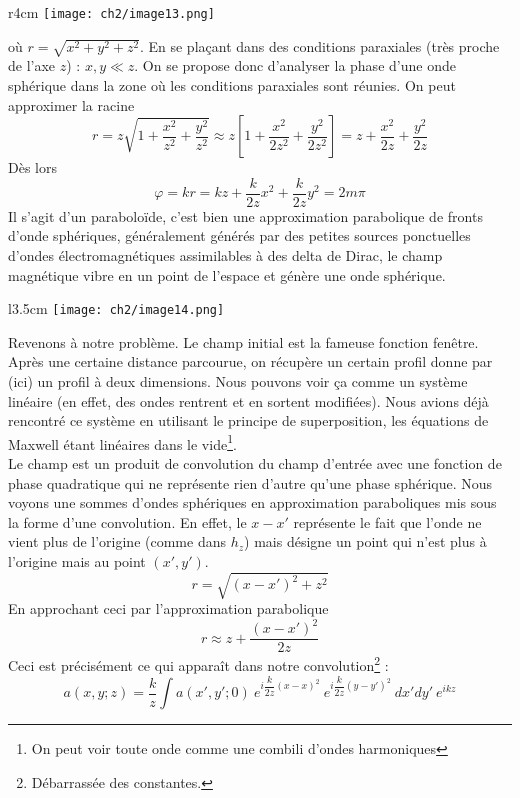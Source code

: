 \begin{wrapfigure}[8]{r}{4cm}
\vspace{-4mm}
\texttt{[image: ch2/image13.png]}
\end{wrapfigure}
où $r = \sqrt{x^2+y^2+z^2}$. En se plaçant dans des conditions paraxiales (très proche de 
l'axe $z$) : $x,y \ll z$. On se propose donc d'analyser la phase d'une onde sphérique dans 
la zone où les conditions paraxiales sont réunies. On peut approximer la racine
\begin{equation}
r=z\sqrt{1+\dfrac{x^2}{z^2}+\dfrac{y^2}{z^2}} \approx z\left[1+\dfrac{x^2}{2z^2}+
\dfrac{y^2}{2z^2}\right] = z+ \dfrac{x^2}{2z} + \dfrac{y^2}{2z}
\end{equation}
Dès lors
\begin{equation}
\varphi = kr = kz+ \dfrac{k}{2z}x^2+\dfrac{k}{2z}y^2 = 2m\pi
\end{equation}
Il s'agit d'un paraboloïde, c'est bien une approximation parabolique de fronts d'onde 
sphériques, généralement générés par des petites sources ponctuelles d'ondes électromagnétiques 
assimilables à des delta de Dirac, le champ magnétique vibre en un point de l'espace et 
génère une onde sphérique.\\

\begin{wrapfigure}[11]{l}{3.5cm}
\vspace{-5mm}
\texttt{[image: ch2/image14.png]}
\end{wrapfigure}
Revenons à notre problème. Le champ initial est la fameuse fonction fenêtre. Après une certaine 
distance parcourue, on récupère un certain profil donne par (ici) un profil à deux dimensions. 
Nous pouvons voir ça comme un système linéaire (en effet, des ondes rentrent et en sortent 
modifiées). Nous avions déjà rencontré ce système en  utilisant le principe de superposition, 
les équations de Maxwell étant linéaires dans le vide\footnote{On peut voir toute onde comme 
une combili d'ondes harmoniques}. \\

Le champ est un produit de convolution du champ d'entrée avec une fonction de phase quadratique qui 
ne représente rien d'autre qu'une phase sphérique. Nous voyons une sommes d'ondes sphériques en 
approximation paraboliques mis sous la forme d'une convolution. En effet, le $x-x'$ représente le 
fait que l'onde ne vient plus de l'origine (comme dans $h_z$) mais désigne un point qui n'est plus 
à l'origine mais au point $(x',y')$.
\begin{equation}
r = \sqrt{(x-x')^2+z^2}
\end{equation}
En approchant ceci par l'approximation parabolique
\begin{equation}
r \approx z+\dfrac{(x-x')^2}{2z}
\end{equation}
Ceci est précisément ce qui apparaît dans notre convolution\footnote{Débarrassée des constantes.} :
\begin{equation}
a(x,y;z) = \frac{k}{z}\int a(x',y';0)\ e^{i\dfrac{k}{2z}(x-x)^2}\
 e^{i\dfrac{k}{2z}(y-y')^2}\ dx'dy'\  e^{ikz}
\end{equation}

